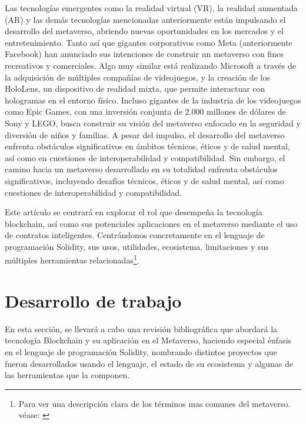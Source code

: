 \documentclass[a4paper,10pt]{article}
\begin{document}
	Las tecnologías emergentes como la realidad virtual (VR), la realidad aumentada (AR) y las demás tecnologías mencionadas anteriormente están impulsando el desarrollo del metaverso, abriendo nuevas oportunidades en los mercados y el entretenimiento. Tanto así que gigantes corporativos como Meta (anteriormente Facebook) han anunciado sus intenciones de construir un metaverso con fines recreativos y comerciales. Algo muy similar está realizando Microsoft a través de la adquisición de múltiples compañías de videojuegos, y la creación de los HoloLens, un dispositivo de realidad mixta, que permite interactuar con hologramas en el entorno físico. Incluso gigantes de la industria de los videojuegos como Epic Games, con una inversión conjunta de 2.000 millones de dólares de Sony y LEGO, busca construir su visión del metaverso  enfocado en la seguridad y diversión de niños y familias. A pesar del impulso, el desarrollo del metaverso enfrenta obstáculos significativos en ámbitos técnicos, éticos y de salud mental, así como en cuestiones de interoperabilidad y compatibilidad. Sin embargo, el camino hacia un metaverso desarrollado en su totalidad enfrenta obstáculos significativos, incluyendo desafíos técnicos, éticos y de salud mental, así como cuestiones de interoperabilidad y compatibilidad. 
	
	Este artículo se centrará en explorar el rol que desempeña la tecnología blockchain, así como sus potenciales aplicaciones en el metaverso mediante el uso de contratos inteligentes. Centrándonos concretamente en el lenguaje de programación Solidity, sus usos, utilidades, ecosistema, limitaciones y sus múltiples herramientas relacionadas\footnote{Para ver una descripción clara de los términos mas comunes del metaverso. véase: \textcite{grandury2022implementacion}}.
	\section{Desarrollo de trabajo}
	En esta sección, se llevará a cabo una revisión bibliográfica que abordará la tecnología Blockchain y su aplicación en el Metaverso, haciendo especial énfasis en el lenguaje de programación Solidity, nombrando distintos proyectos que fueron desarrollados usando el lenguaje, el estado de su ecosistema y algunas de las herramientas que la componen.
	
\end{document}
